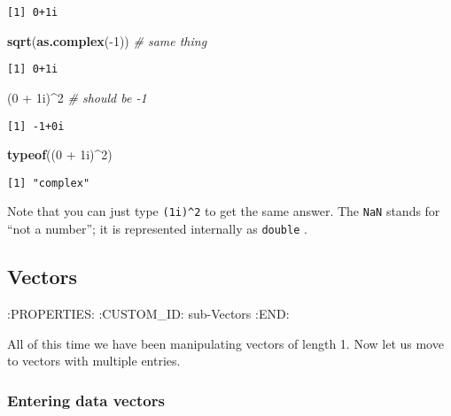 \documentclass[]{book}
\newenvironment{Shaded}{\begin{snugshade}}{\end{snugshade}}
\newcommand{\KeywordTok}[1]{\textcolor[rgb]{0.13,0.29,0.53}{\textbf{{#1}}}}
\newcommand{\DecValTok}[1]{\textcolor[rgb]{0.00,0.00,0.81}{{#1}}}
\newcommand{\StringTok}[1]{\textcolor[rgb]{0.31,0.60,0.02}{{#1}}}
\newcommand{\CommentTok}[1]{\textcolor[rgb]{0.56,0.35,0.01}{\textit{{#1}}}}
\newcommand{\NormalTok}[1]{{#1}}
\numberwithin{equation}{chapter}
\numberwithin{figure}{chapter}
\theoremstyle{plain}
\theoremstyle{definition}
\theoremstyle{remark}
\theoremstyle{definition}
\theoremstyle{definition}
\theoremstyle{remark}
\begin{document}
\begin{verbatim}
[1] 0+1i
\end{verbatim}

\begin{Shaded}
\begin{Highlighting}[]
\KeywordTok{sqrt}\NormalTok{(}\KeywordTok{as.complex}\NormalTok{(-}\DecValTok{1}\NormalTok{))  }\CommentTok{# same thing}
\end{Highlighting}
\end{Shaded}

\begin{verbatim}
[1] 0+1i
\end{verbatim}

\begin{Shaded}
\begin{Highlighting}[]
\NormalTok{(}\DecValTok{0} \NormalTok{+}\StringTok{ }\NormalTok{1i)^}\DecValTok{2}            \CommentTok{# should be -1}
\end{Highlighting}
\end{Shaded}

\begin{verbatim}
[1] -1+0i
\end{verbatim}

\begin{Shaded}
\begin{Highlighting}[]
\KeywordTok{typeof}\NormalTok{((}\DecValTok{0} \NormalTok{+}\StringTok{ }\NormalTok{1i)^}\DecValTok{2}\NormalTok{)}
\end{Highlighting}
\end{Shaded}

\begin{verbatim}
[1] "complex"
\end{verbatim}

Note that you can just type \texttt{(1i)\^{}2} to get the same answer.
The \texttt{NaN}  stands for ``not a number'';
it is represented internally as \texttt{double} .

\subsection{Vectors}\label{vectors}

:PROPERTIES: :CUSTOM\_ID: sub-Vectors :END:

All of this time we have been manipulating vectors of length 1. Now let
us move to vectors with multiple entries.

\subsubsection{Entering data vectors}\label{entering-data-vectors}
\end{document}
